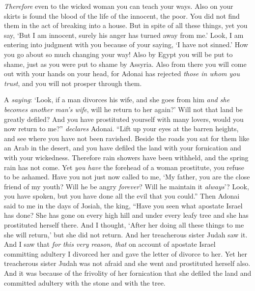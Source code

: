 \begin{biblechapter}
\textit{Therefore} even to the wicked woman you can teach your ways.
\verse Also on your skirts is found 
the blood of the life of the innocent, the poor. 
You did not find them in the act of breaking into a house. 
But in spite of all these things,
\verse yet you say, ‘But I am innocent, 
surely his anger has turned away from me.’ 
Look, I am entering into judgment with you 
because of your saying, ‘I have not sinned.’
\verse How you go about so much changing your way! 
Also by Egypt you will be put to shame, 
just as you were put to shame by Assyria.
\verse Also from there you will come out 
with your hands on your head, 
for Adonai has rejected \textit{those in whom you trust}, 
and you will not prosper through them.
\end{biblechapter}

\begin{biblechapter} %
\verse A \textit{saying}: ‘Look, if a man divorces his wife, 
and she goes from him \textit{and she becomes another man’s wife}, 
will he return to her again?’ 
Will not that land be greatly defiled? 
And you have prostituted yourself with many lovers, 
would you now return to me?” \textit{declares} Adonai.
\verse “Lift up your eyes at the barren heights, 
and see where you have not been ravished. 
Beside the roads you sat for them like an Arab in the desert, 
and you have defiled the land 
with your fornication 
and with your wickedness.
\verse Therefore rain showers have been withheld, 
and the spring rain has not come. 
Yet \textit{you have} the forehead of a woman prostitute, 
you refuse to be ashamed.
\verse Have you not just now called to me, 
‘My father, you are the close friend of my youth?
\verse Will he be angry \textit{forever}? 
Will he maintain it \textit{always}’? 
Look, you have spoken, 
but you have done all the evil that you could.”
 Then Adonai said to me in the days of Josiah, the king, “Have you seen what apostate Israel has done? She has gone on every high hill and under every leafy tree and she has prostituted herself there.
\verse And I thought, ‘After her doing all these things to me she will return,’ but she did not return. And her treacherous sister Judah saw it.
\verse And I saw that \textit{for this very reason, that} on account of apostate Israel committing adultery I divorced her and gave the letter of divorce to her. Yet her treacherous sister Judah was not afraid and she went and prostituted herself also.
\verse And it was because of the frivolity of her fornication that she defiled the land and committed adultery with the stone and with the tree.

\end{biblechapter}
